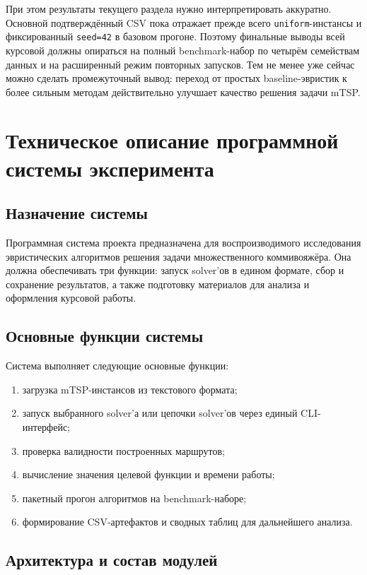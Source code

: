 \documentclass[a4paper,12pt]{article}
\begin{document}
При этом результаты текущего раздела нужно интерпретировать аккуратно. Основной подтверждённый CSV пока отражает прежде всего \texttt{uniform}-инстансы и фиксированный \texttt{seed=42} в базовом прогоне. Поэтому финальные выводы всей курсовой должны опираться на полный benchmark-набор по четырём семействам данных и на расширенный режим повторных запусков. Тем не менее уже сейчас можно сделать промежуточный вывод: переход от простых baseline-эвристик к более сильным методам действительно улучшает качество решения задачи mTSP.

\section{Техническое описание программной системы эксперимента}

\subsection{Назначение системы}

Программная система проекта предназначена для воспроизводимого исследования эвристических алгоритмов решения задачи множественного коммивояжёра. Она должна обеспечивать три функции: запуск solver'ов в едином формате, сбор и сохранение результатов, а также подготовку материалов для анализа и оформления курсовой работы.

\subsection{Основные функции системы}

Система выполняет следующие основные функции:
\begin{enumerate}[label=\arabic*.]
  \item загрузка mTSP-инстансов из текстового формата;
  \item запуск выбранного solver'а или цепочки solver'ов через единый CLI-интерфейс;
  \item проверка валидности построенных маршрутов;
  \item вычисление значения целевой функции и времени работы;
  \item пакетный прогон алгоритмов на benchmark-наборе;
  \item формирование CSV-артефактов и сводных таблиц для дальнейшего анализа.
\end{enumerate}

\subsection{Архитектура и состав модулей}
\end{document}
